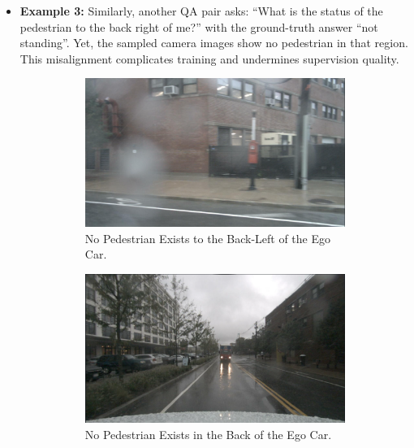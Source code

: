 \documentclass{article} %
\begin{document}
\begin{itemize}
    \item \textbf{Example 3:} 
    Similarly, another QA pair asks: “What is the status of the pedestrian to the back right of me?” with the ground-truth answer “not standing”. Yet, the sampled camera images show no pedestrian in that region. This misalignment complicates training and undermines supervision quality.
\begin{figure}[H]
    \centering
    \begin{subfigure}[t]{0.3\textwidth}
        \includegraphics[width=\linewidth]{Figures/exam3_back_left_ped.png}
        \caption{\small No Pedestrian Exists to the Back-Left of the Ego Car.}
    \end{subfigure}
    \hfill
    \begin{subfigure}[t]{0.3\textwidth}
        \includegraphics[width=\linewidth]{Figures/exam3_back_ped.png}
        \caption{\small No Pedestrian Exists in the Back of the Ego Car.}
    \end{subfigure}
    \hfill
    \begin{subfigure}[t]{0.3\textwidth}

\end{subfigure}
\end{figure}
\end{itemize}
\end{document}
